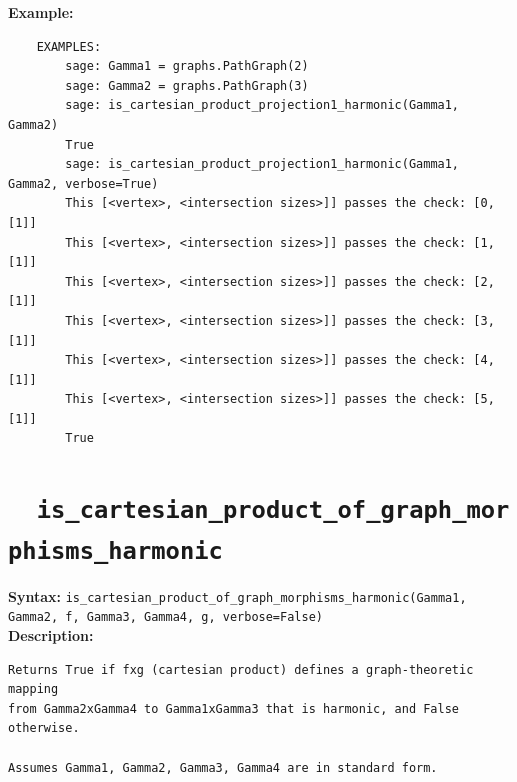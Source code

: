 \documentclass{article}
\begin{document}
\textbf{Example:}
\begin{verbatim}
    EXAMPLES:
        sage: Gamma1 = graphs.PathGraph(2)
        sage: Gamma2 = graphs.PathGraph(3)
        sage: is_cartesian_product_projection1_harmonic(Gamma1, Gamma2) 
        True
        sage: is_cartesian_product_projection1_harmonic(Gamma1, Gamma2, verbose=True) 
        This [<vertex>, <intersection sizes>]] passes the check: [0, [1]]
        This [<vertex>, <intersection sizes>]] passes the check: [1, [1]]
        This [<vertex>, <intersection sizes>]] passes the check: [2, [1]]
        This [<vertex>, <intersection sizes>]] passes the check: [3, [1]]
        This [<vertex>, <intersection sizes>]] passes the check: [4, [1]]
        This [<vertex>, <intersection sizes>]] passes the check: [5, [1]]
        True
\end{verbatim}

\section{\tt \ \ is\_cartesian\_product\_of\_graph\_morphisms\_harmonic}

\textbf{Syntax:}
\verb}is_cartesian_product_of_graph_morphisms_harmonic(Gamma1, Gamma2, f, Gamma3, Gamma4, g, verbose=False)}\\

\textbf{Description:}
\begin{verbatim}
Returns True if fxg (cartesian product) defines a graph-theoretic mapping
from Gamma2xGamma4 to Gamma1xGamma3 that is harmonic, and False otherwise. 

Assumes Gamma1, Gamma2, Gamma3, Gamma4 are in standard form.
\end{verbatim}
\end{document}
